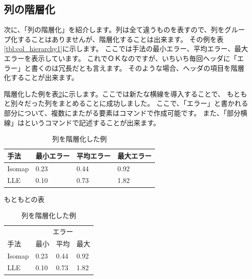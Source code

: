 \documentclass[uplatex,onecolumn,9pt,dvipdfmx]{jsarticle}
\newcommand{\Tref}[1]{表\ref{#1}}
\begin{document}
\subsection{列の階層化}

次に、「列の階層化」を紹介します。列は全て違うものを表すので、列をグループ化することはありませんが、階層化することは出来ます。
その例を\Tref{tbl:col_hierarchy1}に示します。
ここでは手法の最小エラー、平均エラー、最大エラーを表示しています。
これでＯＫなのですが、いちいち毎回ヘッダに「エラー」と書くのは冗長だとも言えます。
そのような場合、ヘッダの項目を階層化することが出来ます。

階層化した例を\Tref{tbl:col_hierarchy2}に示します。ここでは新たな横線を導入することで、
もともと別々だった列をまとめることに成功しました。
ここで、「エラー」と書かれる部分について、複数にまたがる要素は\texttt{\multicolumn}コマンドで作成可能です。
また、「部分横線」は\texttt{\cmidrule}というコマンドで記述することが出来ます。



\begin{table}[h]
    \begin{minipage}[t]{0.48\linewidth}
        \centering
        \begin{tabular}{@{}llll@{}} \toprule
            手法 & 最小エラー & 平均エラー & 最大エラー \\ \midrule
            Isomap & 0.23 & 0.44 & 0.92 \\
            LLE    & 0.10 & 0.73 & 1.82 \\ \bottomrule
        \end{tabular}
        \caption{もともとの表}
        \label{tbl:col_hierarchy1}
    \end{minipage}
    \hfill
    \begin{minipage}[t]{0.48\linewidth}
        \centering
        \begin{tabular}{@{}llll@{}} \toprule
            & \multicolumn{3}{c}{エラー} \\ \cmidrule(l){2-4}
            手法 & 最小 & 平均 & 最大     \\ \midrule
            Isomap & 0.23 & 0.44 & 0.92 \\
            LLE    & 0.10 & 0.73 & 1.82 \\ \bottomrule
        \end{tabular}
        \caption{列を階層化した例}
        \label{tbl:col_hierarchy2}
    \end{minipage}
\end{table}
\end{document}
